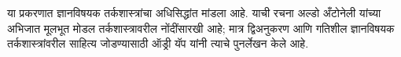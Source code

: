 \documentclass[../../../include/open-logic-chapter]{subfiles}
\begin{document}

\begin{editorial}
  या प्रकरणात ज्ञानविषयक तर्कशास्त्रांचा अधिसिद्धांत
  मांडला आहे. याची रचना अल्डो अँटोनेली यांच्या
  अभिजात मूलभूत मोडल तर्कशास्त्रावरील नोंदींसारखी
  आहे; मात्र द्विअनुकरण आणि गतिशील ज्ञानविषयक
  तर्कशास्त्रांवरील साहित्य जोडण्यासाठी ऑड्री यॅप
  यांनी त्याचे पुनर्लेखन केले आहे.
\end{editorial}



\OLEndPartHook
\end{document}
